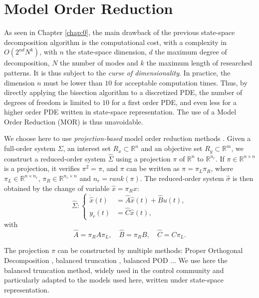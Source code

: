  \section{Model Order Reduction}
 \label{sec:reduction}
 
 As seen in Chapter \ref{chap:0}, the main drawback of the previous state-space decomposition algorithm is the computational cost, with a
 complexity in $O(2^{nd}N^k)$, with $n$ the state-space dimension, $d$ the maximum degree 
 of decomposition, $N$ the number of modes and $k$ the maximum length of researched patterns.
 It is thus subject to the {\em curse of dimensionality}. In practice,
 the dimension $n$ must be lower than $10$ for acceptable computation times. 
 Thus, by directly applying the bisection algorithm to a discretized PDE, the number
 of degrees of freedom is limited to $10$ for a first order PDE, and even less for a higher order
 PDE written in state-space representation.
 The use of a Model Order Reduction (MOR) is thus unavoidable. 
 
 We choose here to use {\em projection-based} model order reduction methods \cite{Antoulas-Sorensen-Gugercin00}.
 Given a full-order system $\Sigma$, an interest set $R_x \subset \mathbb{R}^n$
and an objective set $R_y \subset \mathbb{R}^m$,
we construct a reduced-order system $\hat \Sigma$ using a projection $\pi$
of $\mathbb{R}^n$ to $\mathbb{R}^{n_r}$. If $\pi\in\mathbb{R}^{n\times n}$ 
is a projection, it verifies
 $\pi^2=\pi$, and $\pi$ can be written as
$\pi=\pi_L \pi_R$, where $\pi_L\in\mathbb{R}^{n\times n_r}$, $\pi_R\in\mathbb{R}^{n_r\times n}$
and $n_r = rank(\pi)$. The reduced-order system $\hat \sigma$ is then obtained by the 
change of variable $\hat x = \pi_R x$:
\[
\hat \Sigma : \left\lbrace
\begin{array}{ll}
\dot{\hat{x}}(t) & =\hat{A} \hat{x}(t)+\hat{B} u(t), \\
 y_r(t) & =\hat{C} \hat{x}(t),
\end{array}
\right.
\]
with
\[\hat{A}=\pi_RA\pi_L, \quad \hat{B}=\pi_RB, \quad \hat{C}=C\pi_L.\]
 
 The projection $\pi$ can be constructed by multiple methods: Proper Orthogonal Decomposition 
 \cite{cordier_POD,POD1}, \linebreak balanced truncation \cite{benner2008numerical,Antoulas2001,Moore81,benner2010balanced}, balanced POD \cite{Willcox02}... We use here the balanced truncation
method, widely used in the control community and particularly adapted to
the models used here, written under state-space representation.
 

